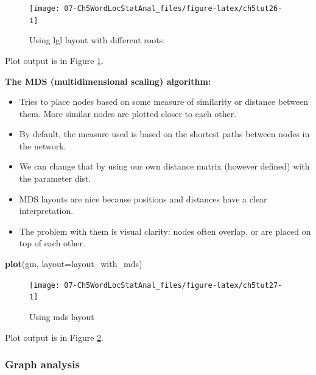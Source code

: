 \documentclass[
]{article}
\newenvironment{Shaded}{\begin{snugshade}}{\end{snugshade}}
\newcommand{\AttributeTok}[1]{\textcolor[rgb]{0.13,0.29,0.53}{#1}}
\newcommand{\FunctionTok}[1]{\textcolor[rgb]{0.13,0.29,0.53}{\textbf{#1}}}
\newcommand{\NormalTok}[1]{#1}
\providecommand{\tightlist}{%
  \setlength{\itemsep}{0pt}\setlength{\parskip}{0pt}}
\begin{document}
\begin{figure}

{\centering \texttt{[image: 07-Ch5WordLocStatAnal\_files/figure-latex/ch5tut26-1]} 

}

\caption{Using lgl layout with different roots}\label{fig:ch5tut26}
\end{figure}

Plot output is in Figure \ref{fig:ch5tut26}.

\textbf{The MDS (multidimensional scaling) algorithm:}

\begin{itemize}
\tightlist
\item
  Tries to place nodes based on some measure of similarity or distance between them. More similar nodes are plotted closer to each other.
\item
  By default, the measure used is based on the shortest paths between nodes in the network.
\item
  We can change that by using our own distance matrix (however defined) with the parameter dist.
\item
  MDS layouts are nice because positions and distances have a clear interpretation.
\item
  The problem with them is visual clarity: nodes often overlap, or are placed on top of each other.
\end{itemize}

\begin{Shaded}
\begin{Highlighting}[]
\FunctionTok{plot}\NormalTok{(gm, }\AttributeTok{layout=}\NormalTok{layout\_with\_mds)}
\end{Highlighting}
\end{Shaded}

\begin{figure}

{\centering \texttt{[image: 07-Ch5WordLocStatAnal\_files/figure-latex/ch5tut27-1]} 

}

\caption{Using mds layout}\label{fig:ch5tut27}
\end{figure}

Plot output is in Figure \ref{fig:ch5tut27}.

\hypertarget{graph-analysis}{%
\subsubsection{Graph analysis}\label{graph-analysis}}
\end{document}

